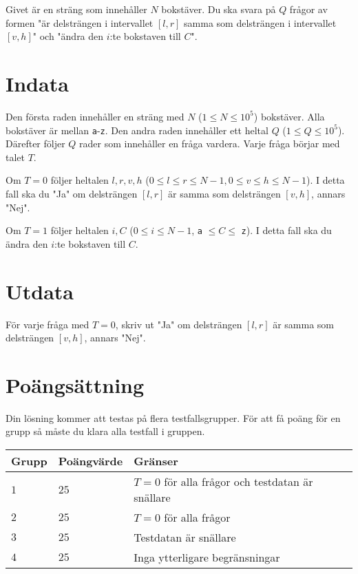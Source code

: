 Givet är en sträng som innehåller $N$ bokstäver. Du ska svara på $Q$ frågor av formen "är delsträngen i
intervallet $[l,r]$ samma som delsträngen i intervallet $[v,h]$" och "ändra den $i$:te bokstaven till $C$".

\section*{Indata}
Den första raden innehåller en sträng med $N$ ($1 \leq N \leq 10^5$) bokstäver. Alla bokstäver är mellan
\texttt{a}-\texttt{z}.
Den andra raden innehåller ett heltal $Q$ ($1 \leq Q \leq 10^5$).
Därefter följer $Q$ rader som innehåller en fråga vardera. Varje fråga börjar med talet $T$.

Om $T=0$ följer heltalen $l,r,v,h$ ($0 \leq l \leq r \leq N-1, 0 \leq v \leq h \leq N-1$).
I detta fall ska du "Ja" om delsträngen $[l,r]$ är samma som delsträngen $[v,h]$, annars "Nej".

Om $T=1$ följer heltalen $i, C$ ($0 \leq i \leq N-1$, \texttt{a} $\leq C \leq$ \texttt{z}). I detta fall ska du ändra den $i$:te bokstaven till $C$. 

\section*{Utdata}
För varje fråga med $T=0$, skriv ut "Ja" om delsträngen $[l,r]$ är samma som delsträngen $[v,h]$, annars "Nej".

\section*{Poängsättning}
Din lösning kommer att testas på flera testfallsgrupper.
\noindent
För att få poäng för en grupp så måste du klara alla testfall i gruppen.

\noindent
\begin{tabular}{| l | l | l |}
\hline
  Grupp & Poängvärde & Gränser \\ \hline
  $1$    & $25$       &  $T=0$ för alla frågor och testdatan är snällare \\ \hline
  $2$    & $25$       &  $T=0$ för alla frågor \\ \hline
  $3$    & $25$       &  Testdatan är snällare \\ \hline
  $4$    & $25$       &  Inga ytterligare begränsningar \\ \hline
\end{tabular}
